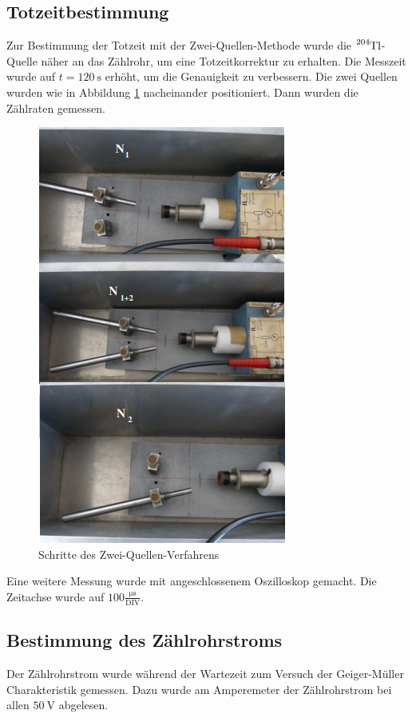 \subsection{Totzeitbestimmung}
Zur Bestimmung der Totzeit mit der Zwei-Quellen-Methode wurde die $\ce{^{204}Tl}$-Quelle näher an das Zählrohr, um eine Totzeitkorrektur zu erhalten.
Die Messzeit wurde auf $t=\SI{120}{\second}$ erhöht, um die Genauigkeit zu verbessern.
Die zwei Quellen wurden wie in Abbildung \ref{fig:zqm} nacheinander positioniert. Dann wurden die Zählraten gemessen.
\begin{figure}
  \centering
  \includegraphics[scale=0.6]{pics/zqmethode.png}
  \caption{Schritte des Zwei-Quellen-Verfahrens}
  \label{fig:zqm}
\end{figure}
Eine weitere Messung wurde mit angeschlossenem Oszilloskop gemacht. Die Zeitachse wurde auf $100 \frac{\si{\micro \second}}{\text{DIV}}$.
\subsection{Bestimmung des Zählrohrstroms}
Der Zählrohrstrom wurde während der Wartezeit zum Versuch der Geiger-Müller Charakteristik gemessen.
Dazu wurde am Amperemeter der Zählrohrstrom bei allen $\SI{50}{\volt}$ abgelesen. 